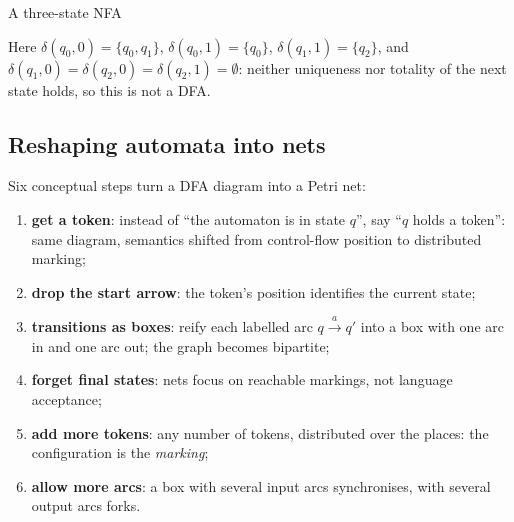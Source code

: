 \begin{examplebox}{A three-state NFA}
\begin{center}
\end{center}
Here $\delta(q_0, 0) = \{q_0, q_1\}$, $\delta(q_0, 1) = \{q_0\}$, $\delta(q_1, 1) = \{q_2\}$, and $\delta(q_1, 0) = \delta(q_2, 0) = \delta(q_2, 1) = \emptyset$: neither uniqueness nor totality of the next state holds, so this is not a DFA.
\end{examplebox}

\subsection{Reshaping automata into nets}

Six conceptual steps turn a DFA diagram into a Petri net:
\begin{enumerate}
  \item \textbf{get a token}: instead of ``the automaton is in state $q$'', say ``$q$ holds a token'': same diagram, semantics shifted from control-flow position to distributed marking;
  \item \textbf{drop the start arrow}: the token's position identifies the current state;
  \item \textbf{transitions as boxes}: reify each labelled arc $q \xrightarrow{a} q'$ into a box with one arc in and one arc out; the graph becomes bipartite;
  \item \textbf{forget final states}: nets focus on reachable markings, not language acceptance;
  \item \textbf{add more tokens}: any number of tokens, distributed over the places: the configuration is the \emph{marking};
  \item \textbf{allow more arcs}: a box with several input arcs synchronises, with several output arcs forks.
\end{enumerate}

